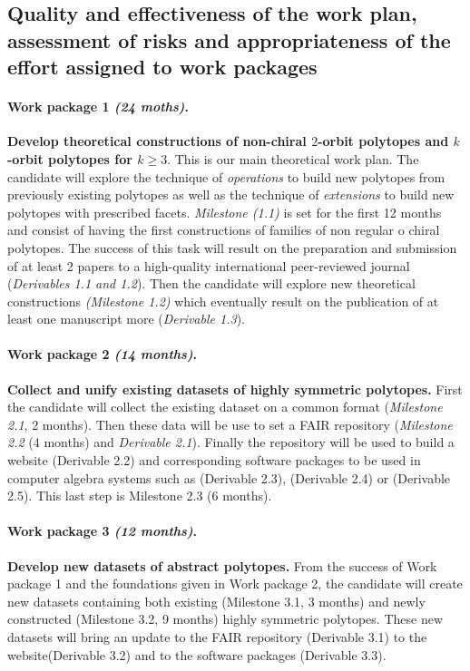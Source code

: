 
\subsection{Quality and effectiveness of the work plan, assessment of risks and appropriateness of the effort assigned to work packages}
\label{sec:implementationworkplan}

\paragraph{Work package 1 \textit{(24 moths)}.} \textbf{Develop theoretical constructions of non-chiral $2$-orbit polytopes and $k$-orbit polytopes for $k \geq 3$}. This is our main theoretical work plan. The candidate will explore the technique of \emph{operations} to build new polytopes from previously existing polytopes as well as the technique of \emph{extensions} to build new polytopes with prescribed facets.  \emph{Milestone (1.1)} is set for the first 12 months and consist of having the first constructions of families of non regular o chiral polytopes. The success of this task will result on the preparation and submission of at least 2 papers to a high-quality international peer-reviewed journal (\emph{Derivables 1.1 and 1.2}).
Then the candidate will explore new theoretical constructions \emph{(Milestone 1.2)} which eventually result on the publication of at least one manuscript more (\emph{Derivable 1.3}).

\paragraph{Work package 2 \textit{(14 months)}.}
\textbf{Collect and unify existing datasets of highly symmetric polytopes.}
First the candidate will collect the existing dataset on a common format (\emph{Milestone 2.1}, 2 months). Then these data will be use to set a FAIR repository (\emph{Milestone 2.2} (4 months) and \emph{Derivable 2.1}).
Finally the repository will be used to build a website (Derivable 2.2) and corresponding software packages to be used in computer algebra systems such as \gap (Derivable 2.3), \magma (Derivable 2.4) or \sage (Derivable 2.5). This last step is Milestone 2.3 (6 months).

\paragraph{Work package 3 \textit{(12 months)}.} \textbf{Develop new datasets of abstract polytopes.} From the success of Work package 1 and the foundations given in Work package 2, the candidate will create new datasets containing both existing (Milestone 3.1, 3 months) and newly constructed (Milestone 3.2, 9 months) highly symmetric polytopes.
These new datasets will bring an update to the FAIR repository (Derivable 3.1) to the website(Derivable 3.2) and to the software packages (Derivable 3.3).



